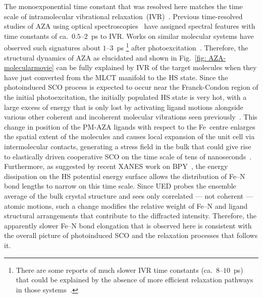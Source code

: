 The monoexponential time constant that was resolved here matches
the time scale of intramolecular vibrational relaxation~(IVR)~\cite{Muller2013}.
%
Previous time-resolved studies of AZA using optical spectroscopies~\cite{Marino2013, Marino2016}
have assigned spectral features with time constants of ca.~$0.5$--$2$~ps to IVR.
Works on similar molecular systems have observed such signatures about $1$--$3$~ps%
\footnote{There are some reports of much slower IVR time constants (ca.~$8$--$10$~ps)
that could be explained by the absence of more efficient relaxation pathways
in those systems~\cite{Monat2000, Smeigh2008}.}
after photoexcitation~\cite{Bhasikuttan2002, Juban2005,Bertoni2012, Consani2009,
Aubock2015, Field2016, Lemke2017}.
%
Therefore, the structural dynamics of AZA as elucidated
and shown in Fig.~\ref{fig: AZA-molecularmovie} can be fully explained by IVR
of the target molecules when they have just converted from the MLCT manifold to the HS state.
%
Since the photoinduced SCO process is expected to occur near the Franck-Condon region
of the initial photoexcitation, the initially populated HS state is very hot,
with a large excess of energy that is only lost by activating ligand motions
alongside various other coherent and incoherent molecular vibrations seen previously~\cite{Marino2016}.
%
This change in position of the PM-AZA ligands with respect to the Fe~centre enlarges
the spatial extent of the molecules and causes local expansion of the unit cell
via intermolecular contacts, generating a stress field in the bulk
that could give rise to elastically driven cooperative SCO
on the time scale of tens of nanoseconds~\cite{Bertoni2016a, Bertoni2016b}.
%
Furthermore, as suggested by recent XANES work on BPY~\cite{Lemke2017},
the energy dissipation on the HS potential energy surface
allows the distribution of Fe--N bond lengths to narrow on this time scale.
%
Since UED probes the ensemble average of the bulk crystal structure
and sees only correlated --- not coherent --- atomic motions,
such a change modifies the relative weight of Fe--N and ligand structural arrangements
that contribute to the diffracted intensity.
%
Therefore, the apparently slower Fe--N bond elongation that is observed here
is consistent with the overall picture of photoinduced SCO and the relaxation processes
that follows it.

